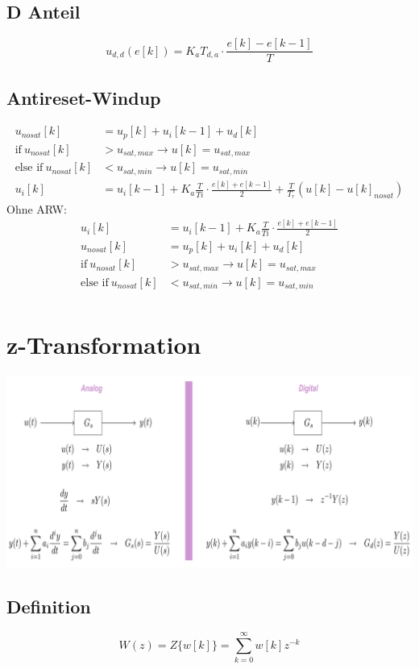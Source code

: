 \subsection{D Anteil}
\[
	u_{d,d}(e[k])=K_aT_{d,a} \cdot \frac{e[k]-e[k-1]}{T}
\]
\subsection{Antireset-Windup}
\[\begin{aligned}
	u_{nosat}[k] &= u_p[k] + u_i[k-1] + u_d[k]	\\
	\textrm{if}\ u_{nosat}[k]&>u_{sat,max} \rightarrow {u[k] =  u_{sat,max} } \\
	\textrm{else if}\ u_{nosat}[k]&<u_{sat,min} \rightarrow u[k] =  u_{sat,min} \\
	u_i[k]&= u_i[k-1]+K_a\frac{T}{Ti}\cdot\frac{e[k]+e[k-1]}{2}+\frac{T}{T_r}(u[k]-u[k]_{nosat})
\end{aligned}\]
Ohne ARW:
\[\begin{aligned}
	u_i[k]&= u_i[k-1]+K_a\frac{T}{Ti}\cdot\frac{e[k]+e[k-1]}{2} \\
	u_{nosat}[k] &= u_p[k] + u_i[k] + u_d[k]	\\
	\textrm{if}\ u_{nosat}[k]&>u_{sat,max} \rightarrow {u[k] =  u_{sat,max} } \\
	\textrm{else if}\ u_{nosat}[k]&<u_{sat,min} \rightarrow u[k] =  u_{sat,min} \\
\end{aligned}\]

\section{z-Transformation}
\begin{center}
	\includegraphics[scale = 0.25]{images/z_transf.png}
\end{center}
\subsection{Definition}
\[
	W(z) = Z\{w[k]\} = \sum_{k=0}^{\infty}w[k]z^{-k}
\]
